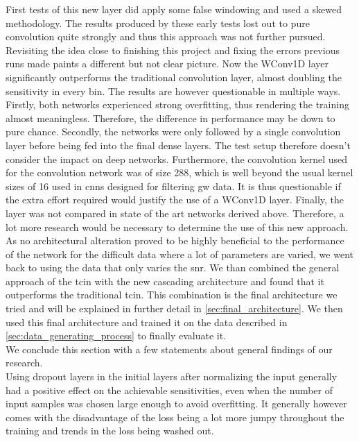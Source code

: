 First tests of this new layer did apply some false windowing and used a skewed methodology. The results produced by these early tests lost out to pure convolution quite strongly and thus this approach was not further pursued. Revisiting the idea close to finishing this project and fixing the errors previous runs made paints a different but not clear picture. Now the WConv1D layer significantly outperforms the traditional convolution layer, almost doubling the sensitivity in every bin. The results are however questionable in multiple ways. Firstly, both networks experienced strong overfitting, thus rendering the training almost meaningless. Therefore, the difference in performance may be down to pure chance. Secondly, the networks were only followed by a single convolution layer before being fed into the final dense layers. The test setup therefore doesn't consider the impact on deep networks. Furthermore, the convolution kernel used for the convolution network was of size 288, which is well beyond the usual kernel sizes of 16 used in \gls{cnn}s designed for filtering \gls{gw} data. It is thus questionable if the extra effort required would justify the use of a WConv1D layer. Finally, the layer was not compared in state of the art networks derived above. Therefore, a lot more research would be necessary to determine the use of this new approach.\medskip\\
As no architectural alteration proved to be highly beneficial to the performance of the network for the difficult data where a lot of parameters are varied, we went back to using the data that only varies the \gls{snr}. We than combined the general approach of the \gls{tcin} with the new cascading architecture and found that it outperforms the traditional \gls{tcin}. This combination is the final architecture we tried and will be explained in further detail in \autoref{sec:final_architecture}. We then used this final architecture and trained it on the data described in \autoref{sec:data_generating_process} to finally evaluate it.\medskip\\
We conclude this section with a few statements about general findings of our research.\\
Using dropout layers in the initial layers after normalizing the input generally had a positive effect on the achievable sensitivities, even when the number of input samples was chosen large enough to avoid overfitting. It generally however comes with the disadvantage of the loss being a lot more jumpy throughout the training and trends in the loss being washed out.\\
